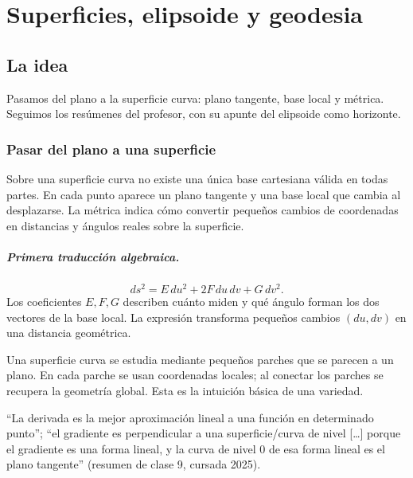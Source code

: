 \chapter{Superficies, elipsoide y geodesia}\label{cap:11}

\section{La idea}

Pasamos del plano a la superficie curva: plano tangente, base local y métrica. Seguimos los resúmenes del profesor, con su apunte del elipsoide como horizonte.

\subsection{Pasar del plano a una superficie}\label{sec:plano-superficie}

{\small\vspace{1mm}\par}


Sobre una superficie curva no existe una única base cartesiana válida en todas partes. En
cada punto aparece un plano tangente y una base local que cambia al desplazarse. La métrica
indica cómo convertir pequeños cambios de coordenadas en distancias y ángulos reales sobre
la superficie.

\paragraph{Primera traducción algebraica.}
\[
  ds^2=E\,du^2+2F\,du\,dv+G\,dv^2.
\]
Los coeficientes \(E,F,G\) describen cuánto miden y qué ángulo forman los dos vectores de la
base local. La expresión transforma pequeños cambios \((du,dv)\) en una distancia geométrica.

\begin{idea}
Una superficie curva se estudia mediante pequeños parches que se parecen a un plano. En cada
parche se usan coordenadas locales; al conectar los parches se recupera la geometría global.
Esta es la intuición básica de una variedad.
\end{idea}

\begin{idea}
``La derivada es la mejor aproximación lineal a una función en determinado punto''; ``el
gradiente es perpendicular a una superficie/curva de nivel [\ldots] porque el gradiente es
una forma lineal, y la curva de nivel 0 de esa forma lineal es el plano tangente'' (resumen de clase 9, cursada 2025).
\end{idea}


